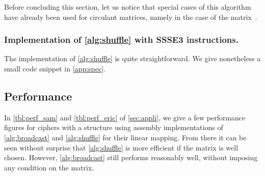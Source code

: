 \medskip

Before concluding this section, let us notice that special cases of this algorithm have already been used for circulant matrices, namely in the case of the \AES{} \mc{} matrix~\cite{vpaes}.

\subsubsection{Implementation of \autoref{alg:shuffle} with SSSE3 instructions.}

The implementation of \autoref{alg:shuffle} is quite straightforward. We give nonetheless a small code snippet in \autoref{app:spec}.

\subsection{Performance}

In \autoref{tbl:perf_sam} and \autoref{tbl:perf_eric} of \autoref{sec:appli}, we give a few performance figures for ciphers with a \shark{} structure using assembly implementations of \autoref{alg:broadcast} and \autoref{alg:shuffle}  for their linear mapping.
From there it can be seen without surprise that \autoref{alg:shuffle} is more efficient if the matrix is well chosen. However, \autoref{alg:broadcast}
still performs reasonably well, without imposing any condition on the matrix.
